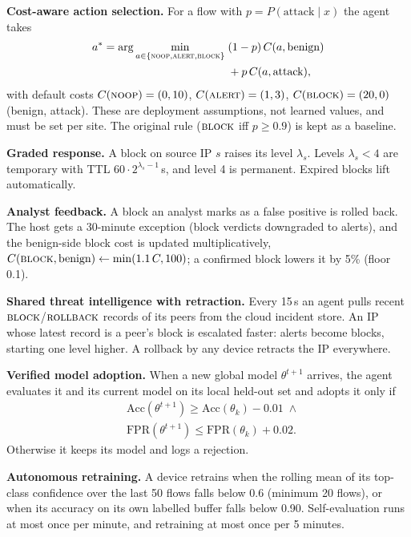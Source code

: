 \documentclass[conference]{IEEEtran}
\begin{document}
\textbf{Cost-aware action selection.} For a flow with
$p = P(\text{attack}\mid x)$ the agent takes
\begin{equation}
\begin{aligned}
a^\ast = \arg\min_{a\in\{\textsc{noop},\textsc{alert},\textsc{block}\}}
\;&(1-p)\,C(a,\text{benign})\\
&+ p\,C(a,\text{attack}),
\end{aligned}
\end{equation}
with default costs $C(\textsc{noop})=(0,10)$, $C(\textsc{alert})=(1,3)$,
$C(\textsc{block})=(20,0)$ (benign, attack). These are deployment
assumptions, not learned values, and must be set per site. The
original rule ($\textsc{block}$ iff $p\ge0.9$) is kept as a baseline.

\textbf{Graded response.} A block on source IP $s$ raises its level
$\lambda_s$. Levels $\lambda_s<4$ are temporary with TTL $60\cdot2^{\lambda_s-1}$\,s,
and level 4 is permanent. Expired blocks lift automatically.

\textbf{Analyst feedback.} A block an analyst marks as a false positive is
rolled back. The host gets a 30-minute exception (block verdicts downgraded
to alerts), and the benign-side block cost is updated multiplicatively,
$C(\textsc{block},\text{benign}) \leftarrow \min(1.1\,C, 100)$; a confirmed
block lowers it by 5\% (floor 0.1).

\textbf{Shared threat intelligence with retraction.} Every 15\,s an agent
pulls recent $\textsc{block}$/$\textsc{rollback}$ records of its peers from
the cloud incident store. An IP whose latest record is a peer's block is
escalated faster: alerts become blocks, starting one level higher. A
rollback by any device retracts the IP everywhere.

\textbf{Verified model adoption.} When a new global model $\theta^{t+1}$
arrives, the agent evaluates it and its current model on its local held-out
set and adopts it only if
\begin{equation}
\begin{aligned}
&\mathrm{Acc}(\theta^{t+1}) \ge \mathrm{Acc}(\theta_k) - 0.01 \;\wedge\\
&\mathrm{FPR}(\theta^{t+1}) \le \mathrm{FPR}(\theta_k) + 0.02 .
\end{aligned}
\end{equation}
Otherwise it keeps its model and logs a rejection.

\textbf{Autonomous retraining.} A device retrains when the rolling mean
of its top-class confidence over the last 50 flows falls below 0.6
(minimum 20 flows), or when its accuracy on its own labelled buffer falls
below 0.90. Self-evaluation runs at most once per minute, and retraining at
most once per 5 minutes.
\end{document}
